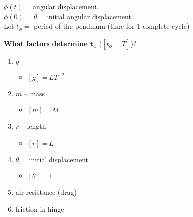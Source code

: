 \documentclass[
	date={August 26{,} 2024}
]{math486notes}
\begin{document}
\begin{example}[Pendulum]
	$\phi(t)$ = angular displacement.\\
	$\phi(0)$ = $\theta$ = initial angular displacement.\\
	Let $t_{\phi} = $ period of the pendulum (time for 1 complete cycle)

	\textbf{What factors determine $\mathbf{t_{\phi}}$} ($[t_{\phi} = T]$)?
	\begin{enumerate}
		\item $g$
		\begin{itemize}
			\item $[g] = LT^{-2}$
		\end{itemize}
		\item $m$ -- mass
		\begin{itemize}
			\item $[m] = M$
		\end{itemize}
		\item $r$ -- length
		\begin{itemize}
			\item $[r] = L$
		\end{itemize}
		\item $\theta$ = initial displacement
		\begin{itemize}
			\item $[\theta] = 1$
		\end{itemize}
		\item air resistance (drag)
		\item friction in hinge
	\end{enumerate}


\end{example}
\end{document}
